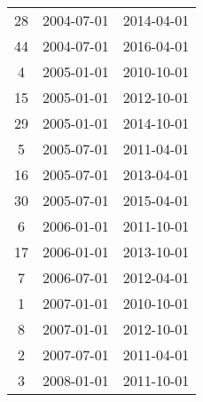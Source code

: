 \begin{tabular}{ccc}
  28 & 2004-07-01 & 2014-04-01 \\ 
  44 & 2004-07-01 & 2016-04-01 \\ 
  4 & 2005-01-01 & 2010-10-01 \\ 
  15 & 2005-01-01 & 2012-10-01 \\ 
  29 & 2005-01-01 & 2014-10-01 \\ 
  5 & 2005-07-01 & 2011-04-01 \\ 
  16 & 2005-07-01 & 2013-04-01 \\ 
  30 & 2005-07-01 & 2015-04-01 \\ 
  6 & 2006-01-01 & 2011-10-01 \\ 
  17 & 2006-01-01 & 2013-10-01 \\ 
  7 & 2006-07-01 & 2012-04-01 \\ 
  1 & 2007-01-01 & 2010-10-01 \\ 
  8 & 2007-01-01 & 2012-10-01 \\ 
  2 & 2007-07-01 & 2011-04-01 \\ 
  3 & 2008-01-01 & 2011-10-01 \\ 
   \hline
\end{tabular}
